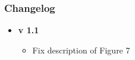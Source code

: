\documentclass[11pt]{article} %
\begin{document}
\subsubsection{Changelog}

\begin{itemize}[noitemsep]
	\item \textbf{v 1.1}
	\begin{itemize}[noitemsep]
		\item Fix description of Figure 7
	\end{itemize}
\end{itemize}
\end{document}
